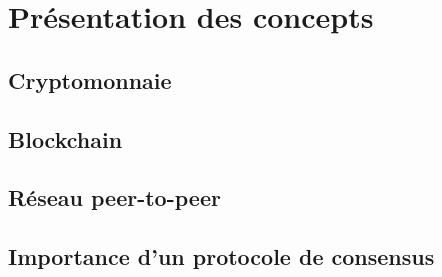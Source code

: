 \chapter{Présentation des concepts}
\label{ch:presentation}

\section{Cryptomonnaie}

\section{Blockchain}

\section{Réseau peer-to-peer}

\section{Importance d'un protocole de consensus}